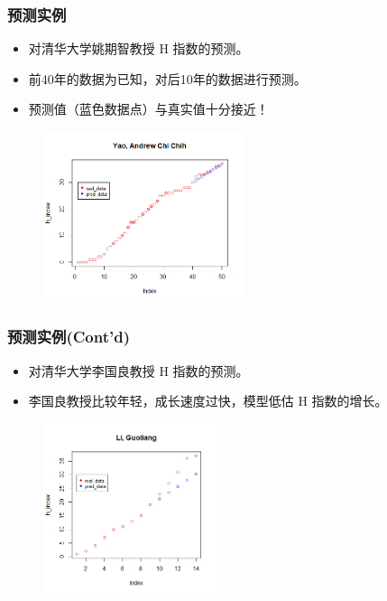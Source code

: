 \documentclass[11pt,compress,t, xcolor=table]{beamer}
\begin{document}
\begin{frame}
	\frametitle{预测实例}
	\begin{itemize}	
		\item 对清华大学姚期智教授 H 指数的预测。
		\item 前40年的数据为已知，对后10年的数据进行预测。
		\item 预测值（蓝色数据点）与真实值十分接近！
	\end{itemize}
	
	\begin{figure}[H]
		\footnotesize
		\centering
		\includegraphics[height=5cm]{image/yao_arima.png}
	\end{figure}
	
\end{frame}

\begin{frame}
	\frametitle{预测实例(Cont'd)}
	\begin{itemize}	
		\item 对清华大学李国良教授 H 指数的预测。
		\item 李国良教授比较年轻，成长速度过快，模型低估 H 指数的增长。
	\end{itemize}
	
	\begin{figure}[H]
		\footnotesize
		\centering
		\includegraphics[height=5cm]{image/lgl1.png}
	\end{figure}
	
\end{frame}
\end{document}
